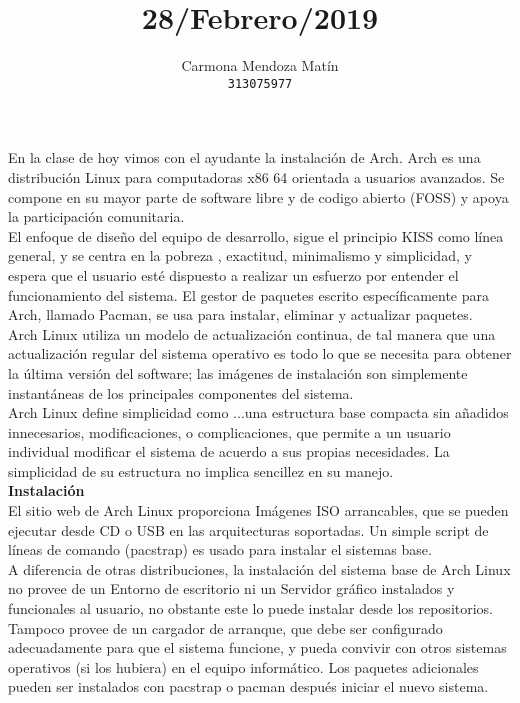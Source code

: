 \documentclass[11pt, a4paper]{report}
\begin{document}
\title{28/Febrero/2019}
\author{
  Carmona Mendoza Mat\'in\\
  \texttt{313075977}
}
\date{}
\maketitle

En la clase de hoy vimos con el ayudante la instalación de Arch. Arch es una
distribución Linux para computadoras x86 64 orientada a usuarios avanzados. Se
compone en su mayor parte de software libre y de codigo abierto (FOSS)​ y
apoya la participación comunitaria. \\

El enfoque de diseño del equipo de desarrollo, sigue el principio KISS como
línea general, y se centra en la pobreza , exactitud, minimalismo y
simplicidad, y espera que el usuario esté dispuesto a realizar un esfuerzo por
entender el funcionamiento del sistema. El gestor de paquetes escrito
específicamente para Arch, llamado Pacman, se usa para instalar, eliminar y
actualizar paquetes. \\

Arch Linux utiliza un modelo de actualización continua, de tal manera que una
actualización regular del sistema operativo es todo lo que se necesita para
obtener la última versión del software; las imágenes de instalación son
simplemente instantáneas de los principales componentes del sistema. \\

Arch Linux define simplicidad como ...una estructura base compacta sin añadidos
innecesarios, modificaciones, o complicaciones, que permite a un usuario
individual modificar el sistema de acuerdo a sus propias necesidades. La
simplicidad de su estructura no implica sencillez en su manejo.\\

\textbf{Instalación} \\

El sitio web de Arch Linux proporciona Imágenes ISO arrancables, que se pueden
ejecutar desde CD o USB en las arquitecturas soportadas. Un simple script de
líneas de comando (pacstrap) es usado para instalar el sistemas base. \\

A diferencia de otras distribuciones, la instalación del sistema base de Arch
Linux no provee de un Entorno de escritorio ni un Servidor gráfico instalados y
funcionales al usuario, no obstante este lo puede instalar desde los
repositorios. Tampoco provee de un cargador de arranque, que debe ser
configurado adecuadamente para que el sistema funcione, y pueda convivir con
otros sistemas operativos (si los hubiera) en el equipo informático. Los
paquetes adicionales pueden ser instalados con pacstrap o pacman después
iniciar el nuevo sistema. \\
\end{document}
